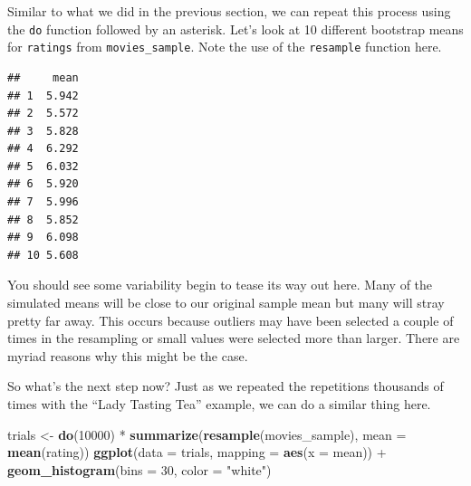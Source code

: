 \documentclass[]{tufte-book}
\newenvironment{Shaded}{\begin{snugshade}}{\end{snugshade}}
\newcommand{\KeywordTok}[1]{\textcolor[rgb]{0.13,0.29,0.53}{\textbf{{#1}}}}
\newcommand{\DataTypeTok}[1]{\textcolor[rgb]{0.13,0.29,0.53}{{#1}}}
\newcommand{\DecValTok}[1]{\textcolor[rgb]{0.00,0.00,0.81}{{#1}}}
\newcommand{\StringTok}[1]{\textcolor[rgb]{0.31,0.60,0.02}{{#1}}}
\newcommand{\NormalTok}[1]{{#1}}
\begin{document}
Similar to what we did in the previous section, we can repeat this
process using the \texttt{do} function followed by an asterisk. Let's
look at 10 different bootstrap means for \texttt{ratings} from
\texttt{movies\_sample}. Note the use of the \texttt{resample} function
here.

\begin{Shaded}
\end{Shaded}

\begin{verbatim}
##     mean
## 1  5.942
## 2  5.572
## 3  5.828
## 4  6.292
## 5  6.032
## 6  5.920
## 7  5.996
## 8  5.852
## 9  6.098
## 10 5.608
\end{verbatim}

You should see some variability begin to tease its way out here. Many of
the simulated means will be close to our original sample mean but many
will stray pretty far away. This occurs because outliers may have been
selected a couple of times in the resampling or small values were
selected more than larger. There are myriad reasons why this might be
the case.

So what's the next step now? Just as we repeated the repetitions
thousands of times with the ``Lady Tasting Tea'' example, we can do a
similar thing here.

\begin{Shaded}
\begin{Highlighting}[]
\NormalTok{trials <-}\StringTok{ }\KeywordTok{do}\NormalTok{(}\DecValTok{10000}\NormalTok{) *}\StringTok{ }\KeywordTok{summarize}\NormalTok{(}\KeywordTok{resample}\NormalTok{(movies_sample), }
                                \DataTypeTok{mean =} \KeywordTok{mean}\NormalTok{(rating))}
\KeywordTok{ggplot}\NormalTok{(}\DataTypeTok{data =} \NormalTok{trials, }\DataTypeTok{mapping =} \KeywordTok{aes}\NormalTok{(}\DataTypeTok{x =} \NormalTok{mean)) +}
\StringTok{  }\KeywordTok{geom_histogram}\NormalTok{(}\DataTypeTok{bins =} \DecValTok{30}\NormalTok{, }\DataTypeTok{color =} \StringTok{"white"}\NormalTok{)}
\end{Highlighting}
\end{Shaded}
\end{document}
